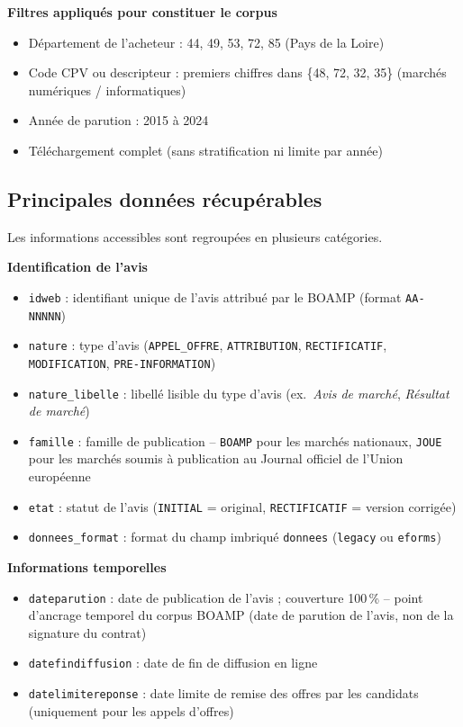 \documentclass[12pt,a4paper]{article}
\begin{document}
\medskip
\textbf{Filtres appliqués pour constituer le corpus}

\begin{itemize}
  \item[---] Département de l'acheteur : 44, 49, 53, 72, 85 (Pays de la Loire)
  \item[---] Code CPV ou descripteur : premiers chiffres dans \{48, 72, 32, 35\}
    (marchés numériques / informatiques)
  \item[---] Année de parution : 2015 à 2024
  \item[---] Téléchargement complet (sans stratification ni limite par année)
\end{itemize}

\subsection{Principales données récupérables}

Les informations accessibles sont regroupées en plusieurs catégories.

\medskip
\textbf{Identification de l'avis}

\begin{itemize}
  \item[---] \texttt{idweb} : identifiant unique de l'avis attribué par le
    BOAMP (format \texttt{AA-NNNNN})
  \item[---] \texttt{nature} : type d'avis (\texttt{APPEL\_OFFRE},
    \texttt{ATTRIBUTION}, \texttt{RECTIFICATIF}, \texttt{MODIFICATION},
    \texttt{PRE-INFORMATION})
  \item[---] \texttt{nature\_libelle} : libellé lisible du type d'avis
    (ex.\ \textit{Avis de marché}, \textit{Résultat de marché})
  \item[---] \texttt{famille} : famille de publication -- \texttt{BOAMP}
    pour les marchés nationaux, \texttt{JOUE} pour les marchés soumis à
    publication au Journal officiel de l'Union européenne
  \item[---] \texttt{etat} : statut de l'avis (\texttt{INITIAL} = original,
    \texttt{RECTIFICATIF} = version corrigée)
  \item[---] \texttt{donnees\_format} : format du champ imbriqué
    \texttt{donnees} (\texttt{legacy} ou \texttt{eforms})
\end{itemize}

\medskip
\textbf{Informations temporelles}

\begin{itemize}
  \item[---] \texttt{dateparution} : date de publication de l'avis ;
    couverture 100\,\% -- point d'ancrage temporel du corpus BOAMP (date de
    parution de l'avis, non de la signature du contrat)
  \item[---] \texttt{datefindiffusion} : date de fin de diffusion en ligne
  \item[---] \texttt{datelimitereponse} : date limite de remise des offres
    par les candidats (uniquement pour les appels d'offres)
\end{itemize}
\end{document}
